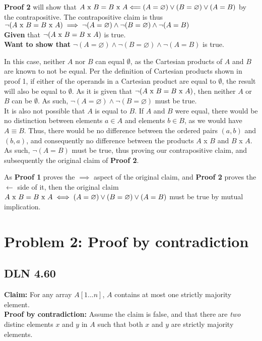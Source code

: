 \documentclass[titlepage]{article}
\begin{document}
\textbf{Proof 2} will show that \(A $ x $ B = B $ x $ A \Longleftarrow (A= \varnothing) \lor (B= \varnothing) \lor (A=B)\) by the contrapositive. The contrapositive claim is thus \(\lnot (A $ x $ B = B $ x $ A) \implies \lnot(A= \varnothing) \land \lnot (B= \varnothing) \land \lnot (A=B)\)\\
\textbf{Given} that \(\lnot (A $ x $ B = B $ x $ A)\) is true.\\
\textbf{Want to show that} \(\lnot(A= \varnothing) \land \lnot (B= \varnothing) \land \lnot (A=B)\) is true.

In this case, neither $A$ nor $B$ can equal $\emptyset$, as the Cartesian products of $A$ and $B$ are known to not be equal. Per the definition of Cartesian products shown in proof 1, if either of the operands in a Cartesian product are equal to $\emptyset$, the result will also be equal to $\emptyset$. As it is given that \(\lnot (A $ x $ B = B $ x $ A)\), then neither $A$ or $B$ can be $\emptyset$. As such, \(\lnot(A= \varnothing) \land \lnot (B= \varnothing)\) must be true.\\
It is also not possible that $A$ is equal to $B$. If $A$ and $B$ were equal, there would be no distinction between elements $a \in A$ and elements $b \in B$, as we would have $A \equiv B$. Thus, there would be no difference between the ordered pairs $(a,b)$ and $(b,a)$, and consequently no difference between the products $A$ x $B$ and  $B$ x $A$. As such, \(\lnot (A=B)\) must be true, thus proving our contrapositive claim, and subsequently the original claim of \textbf{Proof 2}.

As \textbf{Proof 1} proves the $\implies$ aspect of the original claim, and \textbf{Proof 2} proves the $\longleftarrow$ side of it, then the original claim \(A $ x $ B = B $ x $ A \iff (A= \varnothing) \lor (B= \varnothing) \lor (A=B)\) must be true by mutual implication.

\section{Problem 2: Proof by contradiction}

\subsection{DLN 4.60}  %

\textbf{Claim: } For any array $A[1 ... n]$, $A$ contains at most one strictly majority element.\\
\textbf{Proof by contradiction: } Assume the claim is false, and that there are \textit{two} distinc elements $x$ and $y$ in $A$ such that both $x$ and $y$ are strictly majority elements.
\end{document}
